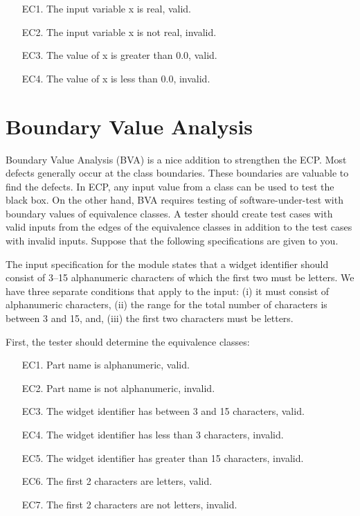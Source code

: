 \begin{enumerate}[noitemsep]
    \item[EC1.] The input variable x is real, valid.
    \item[EC2.] The input variable x is not real, invalid.
    \item[EC3.] The value of x is greater than 0.0, valid.
    \item[EC4.] The value of x is less than 0.0, invalid.
\end{enumerate}

\section{Boundary Value Analysis}
Boundary Value Analysis (BVA) is a nice addition to strengthen the ECP. Most defects generally occur at the class boundaries. These boundaries are valuable to find the defects. In ECP, any input value from a class can be used to test the black box. On the other hand, BVA requires testing of software-under-test with boundary values of equivalence classes. A tester should create test cases with valid inputs from the edges of the equivalence classes in addition to the test cases with invalid inputs. Suppose that the following specifications \autocite{burnstein2006practical} are given to you.

\begin{displayquote}
    The input specification for the module states that a widget identifier should consist of 3–15 alphanumeric characters of which the first two must be letters. We have three separate conditions that apply to the input: (i) it must consist of alphanumeric characters, (ii) the range for the total number of characters is between 3 and 15, and, (iii) the first two characters must be letters.
\end{displayquote}

First, the tester should determine the equivalence classes:
\begin{enumerate}[noitemsep]
    \item[EC1.] Part name is alphanumeric, valid.
    \item[EC2.] Part name is not alphanumeric, invalid.
    \item[EC3.] The widget identifier has between 3 and 15 characters, valid.
    \item[EC4.] The widget identifier has less than 3 characters, invalid.
    \item[EC5.] The widget identifier has greater than 15 characters, invalid.
    \item[EC6.] The first 2 characters are letters, valid.
    \item[EC7.] The first 2 characters are not letters, invalid.
\end{enumerate}

